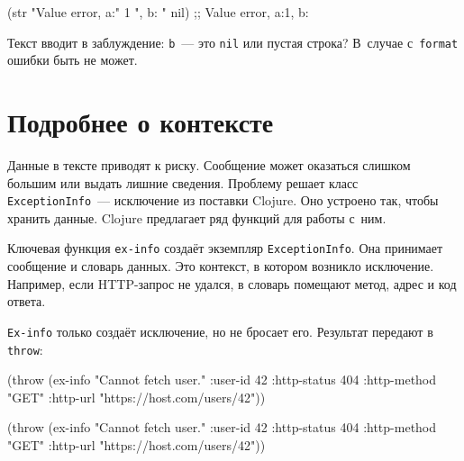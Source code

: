\begin{english}
  \begin{clojure}
(str "Value error, a:" 1 ", b: " nil)
;; Value error, a:1, b:
  \end{clojure}
\end{english}

\noindent
Текст вводит в заблуждение: \verb|b|~--- это \verb|nil| или пустая строка? В~случае
с~\verb|format| ошибки быть не может.

\section{Подробнее о контексте}


Данные в тексте приводят к риску. Сообщение может оказаться слишком большим или
выдать лишние сведения. Проблему решает класс \verb|ExceptionInfo|~---
исключение из поставки Clojure. Оно устроено так, чтобы хранить данные. Clojure
предлагает ряд функций для работы с~ним.

Ключевая функция \verb|ex-info| создаёт экземпляр \verb|ExceptionInfo|. Она
принимает сообщение и словарь данных. Это контекст, в котором возникло
исключение. Например, если HTTP-запрос не удался, в словарь помещают метод,
адрес и код ответа.

\verb|Ex-info| только создаёт исключение, но не бросает его. Результат
передают в \verb|throw|:

\ifx\devicetype\mobile

\begin{english}
  \begin{clojure}
(throw (ex-info
        "Cannot fetch user."
        {:user-id 42
         :http-status 404
         :http-method "GET"
         :http-url
         "https://host.com/users/42"}))
  \end{clojure}
\end{english}

\else

\begin{english}
  \begin{clojure}
(throw (ex-info
        "Cannot fetch user."
        {:user-id 42
         :http-status 404
         :http-method "GET"
         :http-url "https://host.com/users/42"}))
  \end{clojure}
\end{english}

\fi

